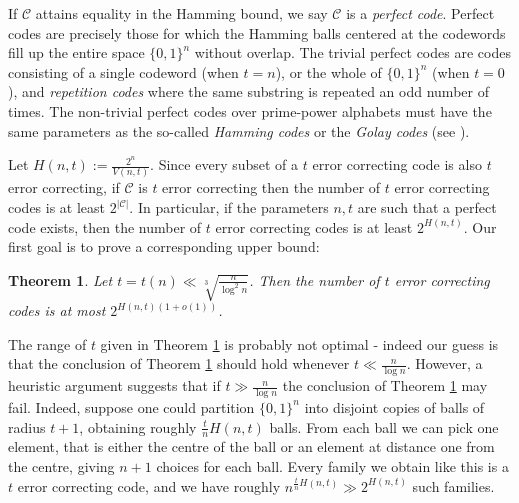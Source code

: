 \documentclass[11pt]{article}
\newtheorem{theorem}{Theorem}[section]
\numberwithin{equation}{section}
\begin{document}
If $\mathcal{C}$ attains equality in the Hamming bound, we say $\mathcal{C}$ is a \emph{perfect code}. Perfect codes are precisely those for which the Hamming balls centered at the codewords fill up the entire space $\{0,1\}^n$ without overlap. The trivial perfect codes are codes consisting of a single codeword (when $t=n$), or the whole of $\{0,1\}^n$ (when $t=0$), and \emph{repetition codes} where the same substring is repeated an odd number of times. The non-trivial perfect codes over prime-power alphabets must have the same parameters as the so-called \emph{Hamming codes} or the \emph{Golay codes} (see \cite{nontrivialperfectcodes}).




Let $H(n,t):=\frac{2^n}{V(n,t)}$. Since every subset of a $t$ error correcting code is also $t$ error correcting,  if $\mathcal{C}$ is $t$ error correcting then the number of $t$ error correcting codes is at least $2^{|\mathcal{C}|}$. In particular, if the parameters $n,t$ are such that a perfect code exists, then the number of $t$ error correcting codes is at least $2^{H(n,t)}$. Our first goal is to prove a corresponding upper bound:
\begin{theorem}\label{numberoferrorcodes}
Let $t=t(n)\ll\sqrt[3]{\frac{ n}{\log^2 n}}$. Then the number of $t$ error correcting codes is at most $2^{H(n,t)(1+o(1))}$. 
\end{theorem}



The range of $t$ given in Theorem \ref{numberoferrorcodes} is probably not optimal - indeed our guess is that the conclusion of Theorem \ref{numberoferrorcodes} should hold whenever $t\ll\frac{n}{\log n}$. However, a  heuristic argument suggests that if $t\gg\frac{n}{\log n}$ the conclusion of Theorem \ref{numberoferrorcodes} may fail. Indeed, suppose one could partition $\{0,1\}^n$ into disjoint copies of balls of radius $t+1$, obtaining roughly $\frac{t}{n}H(n,t)$ balls. From each ball we can pick one element, that is either the centre of the ball or an element at distance one from the centre, giving $n+1$ choices for each ball. Every family we obtain like this is a $t$ error correcting code, and we have roughly $n^{\frac{t}{n}H(n,t)}\gg 2^{H(n,t)}$ such families.   
\end{document}
